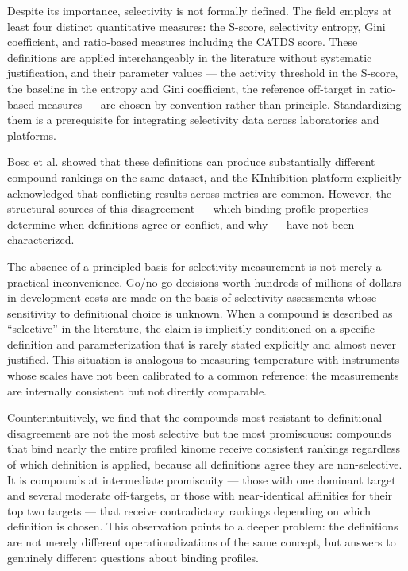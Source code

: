 \documentclass[journal=jcisd8,manuscript=article]{achemso}
\begin{document}
Despite its importance, selectivity is not formally defined.
The field employs at least four distinct quantitative measures:
the S-score,\cite{Karaman2008} selectivity entropy,\cite{Uitdehaag2011}
Gini coefficient,\cite{Graczyk2010} and ratio-based measures including the
CATDS score.\cite{Klaeger2017}
These definitions are applied interchangeably in the literature without
systematic justification, and their parameter values --- the activity threshold
in the S-score, the baseline in the entropy and Gini coefficient, the reference
off-target in ratio-based measures --- are chosen by convention rather than
principle.
Standardizing them is a prerequisite for integrating selectivity data across
laboratories and platforms.

Bosc et al.\cite{Bosc2017} showed that these definitions can produce
substantially different compound rankings on the same dataset, and the
KInhibition platform\cite{KInhibition2018} explicitly acknowledged that
conflicting results across metrics are common.
However, the structural sources of this disagreement --- which binding profile
properties determine when definitions agree or conflict, and why --- have not
been characterized.

The absence of a principled basis for selectivity measurement is not merely
a practical inconvenience.
Go/no-go decisions worth hundreds of millions of dollars in development costs
are made on the basis of selectivity assessments whose sensitivity to
definitional choice is unknown.
When a compound is described as ``selective'' in the literature, the claim is
implicitly conditioned on a specific definition and parameterization that is
rarely stated explicitly and almost never justified.
This situation is analogous to measuring temperature with instruments whose
scales have not been calibrated to a common reference: the measurements are
internally consistent but not directly comparable.

Counterintuitively, we find that the compounds most resistant to
definitional disagreement are not the most selective but the most promiscuous:
compounds that bind nearly the entire profiled kinome receive consistent
rankings regardless of which definition is applied, because all definitions
agree they are non-selective.
It is compounds at intermediate promiscuity --- those with one dominant target
and several moderate off-targets, or those with near-identical affinities for
their top two targets --- that receive contradictory rankings depending on
which definition is chosen.
This observation points to a deeper problem: the definitions are not merely
different operationalizations of the same concept, but answers to genuinely
different questions about binding profiles.
\end{document}
